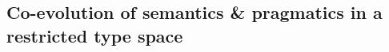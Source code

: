 \documentclass[a4paper, 11pt]{article}
\theoremstyle{Satz}
\newcommand{\mylang}[1]{\ensuremath{L_{\text{#1}}}\xspace} %
\newcommand{\Lbound}{\mylang{bound}}
\newcommand{\Llack}{\mylang{lack}}
\begin{document}
\subsection{Co-evolution of semantics \& pragmatics in a restricted type space}
\label{subsec:example}


\begin{figure}
\centering

    
    




\end{figure}
\end{document}
